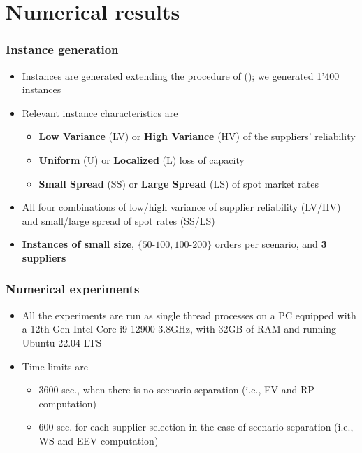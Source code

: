 \documentclass[,9pt,xcolor={dvipsnames}]{beamer} %
\begin{document}
\section {Numerical results}
\begin{frame}%
	\frametitle{Instance generation}
	\begin{itemize}
		\item<1-> Instances are generated extending the procedure of (\cite{crainic2024}); we generated 1'400 instances
		\bigskip
		\item<2-> Relevant instance characteristics are 
		\begin{itemize}
			\medskip
			\item<2-> \textbf{Low Variance} (LV) or \textbf{High Variance} (HV) of the suppliers' reliability
			\medskip
			\item<2-> \textbf{Uniform} (U) or \textbf{Localized} (L) loss of capacity
			\medskip
			\item<2-> \textbf{Small Spread} (SS) or \textbf{Large Spread} (LS) of spot market rates
		\end{itemize}
		\bigskip
		\item<3-> All four combinations of low/high variance of supplier reliability (LV/HV) and small/large spread of spot rates (SS/LS)%
		\bigskip
		\item<4-> \textbf{Instances of small size}, $\{\text{50-100}, \text{100-200}\}$ orders per scenario, and \textbf{3 suppliers}
	\end{itemize}
\end{frame}

\begin{frame}%
	\frametitle{Numerical experiments}
	\begin{itemize}
		\item<1-> All the experiments are run as single thread processes on a PC equipped with a 12th Gen Intel Core i9-12900 3.8GHz, with 32GB of RAM and running Ubuntu 22.04 LTS
		\bigskip
		\item<2-> Time-limits are
		\begin{itemize}
			\medskip
			\item<2-> 3600 sec., when there is no scenario separation (i.e., EV and RP computation) %
			\medskip
			\item<2-> 600 sec. for each supplier selection in the case of scenario separation (i.e., WS and EEV computation)
		\end{itemize}
	\end{itemize}
\end{frame}
\end{document}
